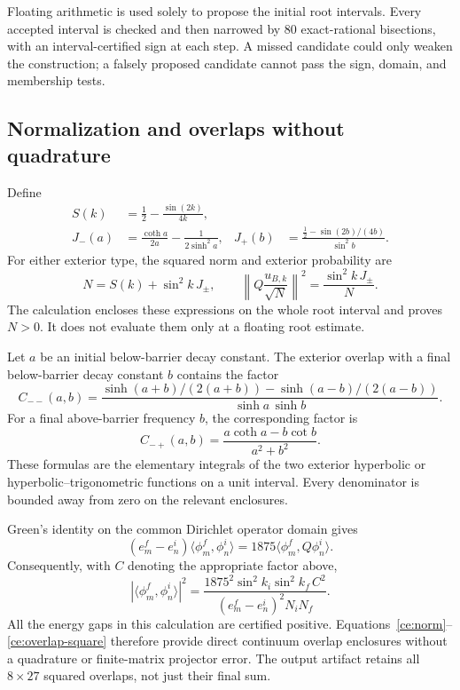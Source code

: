 \documentclass[aps,prl,reprint,superscriptaddress,longbibliography]{revtex4-2}
\begin{document}
Floating arithmetic is used solely to propose the initial root intervals.
Every accepted interval is checked and then narrowed by 80 exact-rational
bisections, with an interval-certified sign at each step. A missed
candidate could only weaken the construction; a falsely proposed
candidate cannot pass the sign, domain, and membership tests.

\subsection{Normalization and overlaps without quadrature}

Define
\begin{align}
 S(k)&=\frac12-\frac{\sin(2k)}{4k},\nonumber\\
 J_-(a)&=\frac{\coth a}{2a}-\frac1{2\sinh^2a},&
 J_+(b)&=\frac{\tfrac12-\sin(2b)/(4b)}{\sin^2b}.
 \label{ce:norm-functions}
\end{align}
For either exterior type, the squared norm and exterior probability are
\begin{equation}
 N=S(k)+\sin^2k\,J_\pm,\qquad
 \left\|Q\frac{u_{B,k}}{\sqrt N}\right\|^2
       =\frac{\sin^2k\,J_\pm}{N}.
 \label{ce:norm}
\end{equation}
The calculation encloses these expressions on the whole root interval
and proves $N>0$. It does not evaluate them only at a floating root
estimate.

Let $a$ be an initial below-barrier decay constant. The exterior overlap
with a final below-barrier decay constant $b$ contains the factor
\begin{equation}
 C_{--}(a,b)=
 \frac{\sinh(a+b)/(2(a+b))-\sinh(a-b)/(2(a-b))}
      {\sinh a\,\sinh b}.
 \label{ce:overlap-sub}
\end{equation}
For a final above-barrier frequency $b$, the corresponding factor is
\begin{equation}
 C_{-+}(a,b)=\frac{a\coth a-b\cot b}{a^2+b^2}.
 \label{ce:overlap-super}
\end{equation}
These formulas are the elementary integrals of the two exterior
hyperbolic or hyperbolic--trigonometric functions on a unit interval.
Every denominator is bounded away from zero on the relevant enclosures.

Green's identity on the common Dirichlet operator domain gives
\begin{equation}
 (e_m^f-e_n^i)\langle\phi_m^f,\phi_n^i\rangle
   =1875\langle\phi_m^f,Q\phi_n^i\rangle.
 \label{ce:green}
\end{equation}
Consequently, with $C$ denoting the appropriate factor above,
\begin{equation}
 |\langle\phi_m^f,\phi_n^i\rangle|^2
 =\frac{1875^2\sin^2k_i\sin^2k_f\,C^2}
        {(e_m^f-e_n^i)^2N_iN_f}.
 \label{ce:overlap-square}
\end{equation}
All the energy gaps in this calculation are certified positive.
Equations~\eqref{ce:norm}--\eqref{ce:overlap-square} therefore provide direct
continuum overlap enclosures without a quadrature or finite-matrix
projector error. The output artifact retains all $8\times27$ squared
overlaps, not just their final sum.
\end{document}
